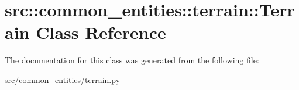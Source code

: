 \hypertarget{classsrc_1_1common__entities_1_1terrain_1_1Terrain}{
\section{src::common\_\-entities::terrain::Terrain Class Reference}
\label{classsrc_1_1common__entities_1_1terrain_1_1Terrain}
}


The documentation for this class was generated from the following file:\begin{DoxyCompactItemize}
\item 
src/common\_\-entities/terrain.py\end{DoxyCompactItemize}
